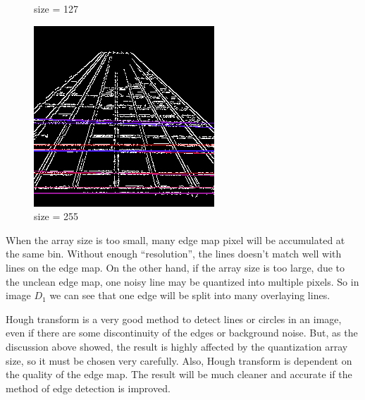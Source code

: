 \documentclass[12pt,a4paper,notitlepage,oneside,amsmath,amssymb]{article}
\begin{document}
\begin{CJK*}{UTF8}{bkai}
\begin{enumerate}[label=(\alph*)]
\begin{figure}[hbt!]
\begin{minipage}{.3\textwidth}
				      \caption*{size = 127}
			      \end{minipage}%
			      \begin{minipage}{.3\textwidth}
				      \centering
				      \includegraphics[width=.9\linewidth]{image_D1_255}
				      \caption*{size = 255}
			      \end{minipage}
			  \end{figure}

			  When the array size is too small, many edge map pixel will be accumulated at the same bin. Without enough ``resolution'', the lines doesn't match well with lines on the edge map. On the other hand, if the array size is too large, due to the unclean edge map, one noisy line may be quantized into multiple pixels. So in image \(D_1\) we can see that one edge will be split into many overlaying lines.

			  Hough transform is a very good method to detect lines or circles in an image, even if there are some discontinuity of the edges or background noise. But, as the discussion above showed, the result is highly affected by the quantization array size, so it must be chosen very carefully. Also, Hough transform is dependent on the quality of the edge map. The result will be much cleaner and accurate if the method of edge detection is improved.

	\end{enumerate}

	\clearpage

\end{CJK*}
\end{document}
